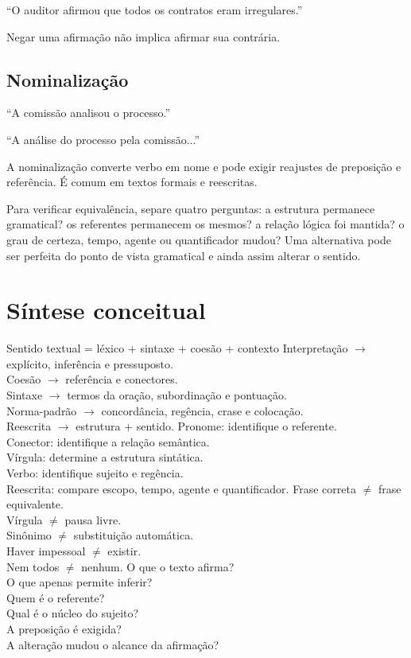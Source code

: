 ``O auditor afirmou que todos os contratos eram irregulares.''

Negar uma afirmação não implica afirmar sua contrária.

\subsection{Nominalização}

``A comissão analisou o processo.''

``A análise do processo pela comissão...''

A nominalização converte verbo em nome e pode exigir reajustes de preposição e referência. É comum em textos formais e reescritas.

\begin{cebraspe}
Para verificar equivalência, separe quatro perguntas: a estrutura permanece gramatical? os referentes permanecem os mesmos? a relação lógica foi mantida? o grau de certeza, tempo, agente ou quantificador mudou? Uma alternativa pode ser perfeita do ponto de vista gramatical e ainda assim alterar o sentido.
\end{cebraspe}

\section{Síntese conceitual}

{Sentido textual = léxico + sintaxe + coesão + contexto}
{Interpretação $\rightarrow$ explícito, inferência e pressuposto.\\Coesão $\rightarrow$ referência e conectores.\\Sintaxe $\rightarrow$ termos da oração, subordinação e pontuação.\\Norma-padrão $\rightarrow$ concordância, regência, crase e colocação.\\Reescrita $\rightarrow$ estrutura + sentido.}
{Pronome: identifique o referente.\\Conector: identifique a relação semântica.\\Vírgula: determine a estrutura sintática.\\Verbo: identifique sujeito e regência.\\Reescrita: compare escopo, tempo, agente e quantificador.}
{Frase correta $\neq$ frase equivalente.\\Vírgula $\neq$ pausa livre.\\Sinônimo $\neq$ substituição automática.\\Haver impessoal $\neq$ existir.\\Nem todos $\neq$ nenhum.}
{O que o texto afirma?\\O que apenas permite inferir?\\Quem é o referente?\\Qual é o núcleo do sujeito?\\A preposição é exigida?\\A alteração mudou o alcance da afirmação?}

